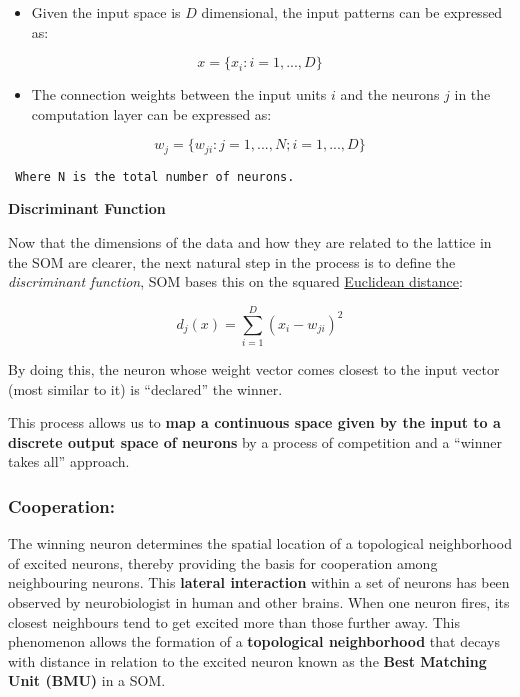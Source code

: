 \documentclass[]{book}
\providecommand{\tightlist}{%
  \setlength{\itemsep}{0pt}\setlength{\parskip}{0pt}}
\begin{document}
\begin{itemize}
\tightlist
\item
  Given the input space is \(D\) dimensional, the input patterns can be
  expressed as:
\end{itemize}

\[x = \{x_i:i=1,...,D\}\]

\begin{itemize}
\tightlist
\item
  The connection weights between the input units \(i\) and the neurons
  \(j\) in the computation layer can be expressed as:
\end{itemize}

\[w_j = \{w_{ji}: j = 1,...,N; i = 1,...,D\}\]

\begin{verbatim}
 Where N is the total number of neurons.
\end{verbatim}

\textbf{Discriminant Function}

Now that the dimensions of the data and how they are related to the
lattice in the SOM are clearer, the next natural step in the process is
to define the \emph{discriminant function}, SOM bases this on the
squared
\href{https://en.wikipedia.org/wiki/Euclidean_distance}{Euclidean
distance}:

\[d_j(x) = \sum_{i=1}^D(x_i - w_{ji})^2\]

By doing this, the neuron whose weight vector comes closest to the input
vector (most similar to it) is ``declared'' the winner.

This process allows us to \textbf{map a continuous space given by the
input to a discrete output space of neurons} by a process of competition
and a ``winner takes all'' approach.

\subsubsection{Cooperation:}\label{cooperation}

The winning neuron determines the spatial location of a topological
neighborhood of excited neurons, thereby providing the basis for
cooperation among neighbouring neurons. This \textbf{lateral
interaction} within a set of neurons has been observed by neurobiologist
in human and other brains. When one neuron fires, its closest neighbours
tend to get excited more than those further away. This phenomenon allows
the formation of a \textbf{topological neighborhood} that decays with
distance in relation to the excited neuron known as the \textbf{Best
Matching Unit (BMU)} in a SOM.
\end{document}
